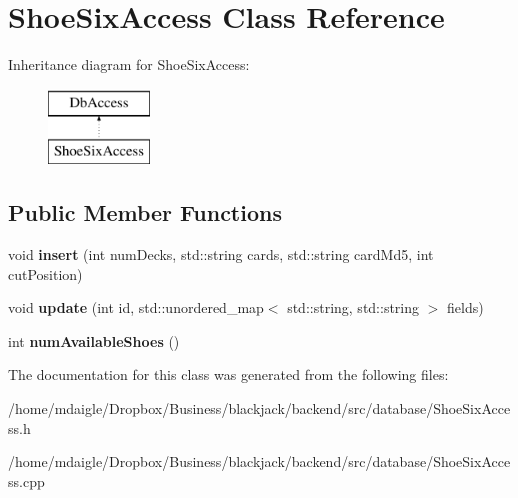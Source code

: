 \hypertarget{classShoeSixAccess}{
\section{\-Shoe\-Six\-Access \-Class \-Reference}
\label{classShoeSixAccess}
}
\-Inheritance diagram for \-Shoe\-Six\-Access\-:\begin{figure}[H]
\begin{center}
\leavevmode
\includegraphics[height=2.000000cm]{classShoeSixAccess}
\end{center}
\end{figure}
\subsection*{\-Public \-Member \-Functions}
\begin{DoxyCompactItemize}
\item 
\hypertarget{classShoeSixAccess_a54c79af33ba1cc82fd8ce2159b1960dc}{
void {\bfseries insert} (int num\-Decks, std\-::string cards, std\-::string card\-Md5, int cut\-Position)}
\label{classShoeSixAccess_a54c79af33ba1cc82fd8ce2159b1960dc}

\item 
\hypertarget{classShoeSixAccess_a0693a2f5f2f5bc3426b72d4d9bb25078}{
void {\bfseries update} (int id, std\-::unordered\-\_\-map$<$ std\-::string, std\-::string $>$ fields)}
\label{classShoeSixAccess_a0693a2f5f2f5bc3426b72d4d9bb25078}

\item 
\hypertarget{classShoeSixAccess_a3388fffe03dcf6f6f17f2ebd5cbd515a}{
int {\bfseries num\-Available\-Shoes} ()}
\label{classShoeSixAccess_a3388fffe03dcf6f6f17f2ebd5cbd515a}

\end{DoxyCompactItemize}


\-The documentation for this class was generated from the following files\-:\begin{DoxyCompactItemize}
\item 
/home/mdaigle/\-Dropbox/\-Business/blackjack/backend/src/database/\-Shoe\-Six\-Access.\-h\item 
/home/mdaigle/\-Dropbox/\-Business/blackjack/backend/src/database/\-Shoe\-Six\-Access.\-cpp\end{DoxyCompactItemize}

